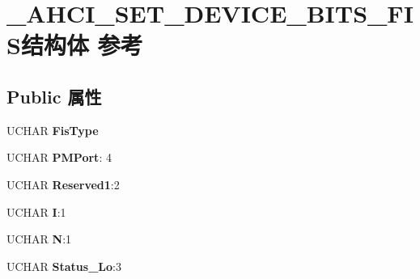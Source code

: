 \hypertarget{struct___a_h_c_i___s_e_t___d_e_v_i_c_e___b_i_t_s___f_i_s}{}\section{\+\_\+\+A\+H\+C\+I\+\_\+\+S\+E\+T\+\_\+\+D\+E\+V\+I\+C\+E\+\_\+\+B\+I\+T\+S\+\_\+\+F\+I\+S结构体 参考}
\label{struct___a_h_c_i___s_e_t___d_e_v_i_c_e___b_i_t_s___f_i_s}
\subsection*{Public 属性}
\begin{DoxyCompactItemize}
\item 
\mbox{\label{struct___a_h_c_i___s_e_t___d_e_v_i_c_e___b_i_t_s___f_i_s_aea704cb893723b8af304101b7d630832}} 
U\+C\+H\+AR {\bfseries Fis\+Type}
\item 
\mbox{\label{struct___a_h_c_i___s_e_t___d_e_v_i_c_e___b_i_t_s___f_i_s_adb0ac57a59b7e4b6ff7caf3687158402}} 
U\+C\+H\+AR {\bfseries P\+M\+Port}\+: 4
\item 
\mbox{\label{struct___a_h_c_i___s_e_t___d_e_v_i_c_e___b_i_t_s___f_i_s_ad506e26ec1740f78b17149f536e66758}} 
U\+C\+H\+AR {\bfseries Reserved1}\+:2
\item 
\mbox{\label{struct___a_h_c_i___s_e_t___d_e_v_i_c_e___b_i_t_s___f_i_s_a15f6456292af31154cb7106c47bad911}} 
U\+C\+H\+AR {\bfseries I}\+:1
\item 
\mbox{\label{struct___a_h_c_i___s_e_t___d_e_v_i_c_e___b_i_t_s___f_i_s_ab63b1906b8270b6d67d4969ee4dd6de9}} 
U\+C\+H\+AR {\bfseries N}\+:1
\item 
\mbox{\label{struct___a_h_c_i___s_e_t___d_e_v_i_c_e___b_i_t_s___f_i_s_abdb30f8bfdb1d3da6985d94219f2f8d8}} 
U\+C\+H\+AR {\bfseries Status\+\_\+\+Lo}\+:3

\end{DoxyCompactItemize}
